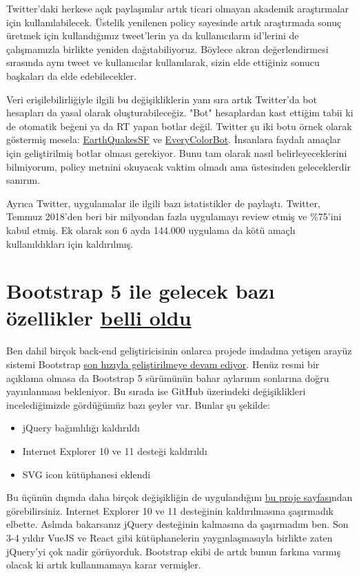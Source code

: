 \documentclass[11pt]{article}
\begin{document}
Twitter'daki herkese açık paylaşımlar artık ticari olmayan akademik
araştırmalar için kullanılabilecek. Üstelik yenilenen policy sayesinde artık
araştırmada sonuç üretmek için kullandığımız tweet'lerin ya da kullanıcıların
id'lerini de çalışmamızla birlikte yeniden dağıtabiliyoruz. Böylece akran
değerlendirmesi sırasında aynı tweet ve kullanıcılar kullanılarak, sizin elde
ettiğiniz sonucu başkaları da elde edebilecekler.

Veri erişilebilirliğiyle ilgili bu değişikliklerin yanı sıra artık Twitter'da
bot hesapları da yasal olarak oluşturabileceğiz. "Bot" hesaplardan kast
ettiğim tabii ki de otomatik beğeni ya da RT yapan botlar değil. Twitter şu
iki botu örnek olarak göstermiş mesela: \href{https://twitter.com/earthquakesSF}{EarthQuakesSF} ve \href{https://twitter.com/everycolorbot}{EveryColorBot}.
İnsanlara faydalı amaçlar için geliştirilmiş botlar olması gerekiyor. Bunu tam
olarak nasıl belirleyeceklerini bilmiyorum, policy metnini okuyacak vaktim
olmadı ama üstesinden geleceklerdir sanırım.

Ayrıca Twitter, uygulamalar ile ilgili bazı istatistikler de paylaştı.
Twitter, Temmuz 2018'den beri bir milyondan fazla uygulamayı review etmiş ve
\%75'ini kabul etmiş. Ek olarak son 6 ayda 144.000 uygulama da kötü amaçlı
kullanıldıkları için kaldırılmış.
\section{Bootstrap 5 ile gelecek bazı özellikler \href{https://themesberg.com/blog/design/bootstrap-5-release-date-and-whats-new}{belli oldu}}
\label{sec:orgb66c676}
Ben dahil birçok back-end geliştiricisinin onlarca projede imdadına yetişen
arayüz sistemi Bootstrap \href{https://github.com/twbs/bootstrap/projects/11}{son hızıyla geliştirilmeye devam ediyor}. Henüz resmi
bir açıklama olmasa da Bootstrap 5 sürümünün bahar aylarının sonlarına doğru
yayınlanması bekleniyor. Bu sırada ise GitHub üzerindeki değişiklikleri
incelediğimizde gördüğümüz bazı şeyler var. Bunlar şu şekilde:

\begin{itemize}
\item jQuery bağımlılığı kaldırıldı
\item Internet Explorer 10 ve 11 desteği kaldırıldı
\item SVG icon kütüphanesi eklendi
\end{itemize}

Bu üçünün dışında daha birçok değişikliğin de uygulandığını \href{https://github.com/twbs/bootstrap/projects/11}{bu proje
sayfası}ndan görebilirsiniz. Internet Explorer 10 ve 11 desteğinin
kaldırılmasına şaşırmadık elbette. Aslında bakarsanız jQuery desteğinin
kalmasına da şaşırmadım ben. Son 3-4 yıldır VueJS ve React gibi kütüphanelerin
yaygınlaşmasıyla birlikte zaten jQuery'yi çok nadir görüyorduk. Bootstrap
ekibi de artık bunun farkına varmış olacak ki artık kullanmamaya karar
vermişler.
\end{document}
